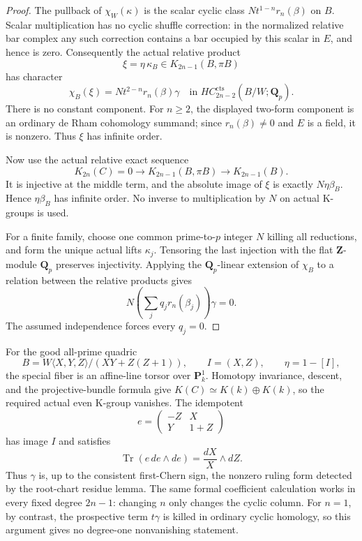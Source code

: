 \begin{proof}
The pullback of $\chi_W(\kappa)$ is the scalar cyclic class
$Nt^{1-n}r_n(\beta)$ on $B$. Scalar multiplication has no cyclic
shuffle correction: in the normalized relative bar complex any
such correction contains a bar occupied by this scalar in $E$,
and hence is zero. Consequently the actual relative product
\[
       \xi=\eta\,\kappa_B\in K_{2n-1}(B,\pi B)
\]
has character
\begin{equation}\label{d3:eq:formalhigherTCcupvalue}
       \chi_B(\xi)=N t^{2-n}r_n(\beta)\gamma
       \quad\text{in }HC_{2n-2}^{\mathrm{cts}}(B/W;\mathbf Q_p).
\end{equation}
There is no constant component. For $n\geq2$, the displayed
two-form component is an ordinary de Rham cohomology summand;
since $r_n(\beta)\ne0$ and $E$ is a field, it is nonzero.
Thus $\xi$ has infinite order.

Now use the actual relative exact sequence
\[
 K_{2n}(C)=0\longrightarrow K_{2n-1}(B,\pi B)
                    \longrightarrow K_{2n-1}(B).
\]
It is injective at the middle term, and the absolute image of
$\xi$ is exactly $N\eta\beta_B$. Hence $\eta\beta_B$ has infinite
order. No inverse to multiplication by $N$ on actual K-groups is used.

For a finite family, choose one common prime-to-$p$ integer $N$
killing all reductions, and form the unique actual lifts
$\kappa_j$. Tensoring the last injection with the flat
$\mathbf Z$-module $\mathbf Q_p$ preserves injectivity.
Applying the $\mathbf Q_p$-linear extension of $\chi_B$ to a
relation between the relative products gives
\[
       N\left(\sum_j q_jr_n(\beta_j)\right)\gamma=0.
\]
The assumed independence forces every $q_j=0$.
\end{proof}

\begin{remark}
For the good all-prime quadric
\[
 B=W\langle X,Y,Z\rangle/(XY+Z(Z+1)),
 \qquad I=(X,Z),\qquad\eta=1-[I],
\]
the special fiber is an affine-line torsor over $\mathbf P^1_k$.
Homotopy invariance, descent, and the projective-bundle formula
give $K(C)\simeq K(k)\oplus K(k)$, so the required actual even
K-group vanishes. The idempotent
\[
 e=\begin{pmatrix}-Z&X\\Y&1+Z\end{pmatrix}
\]
has image $I$ and satisfies
\[
 \operatorname{Tr}(e\,de\wedge de)
                  =\frac{dX}{X}\wedge dZ.
\]
Thus $\gamma$ is, up to the consistent first-Chern sign, the
nonzero ruling form detected by the root-chart residue lemma.
The same formal coefficient calculation works in every fixed
degree $2n-1$: changing $n$ only changes the cyclic column.
For $n=1$, by contrast, the prospective term $t\gamma$ is killed
in ordinary cyclic homology, so this argument gives no
degree-one nonvanishing statement.
\end{remark}

